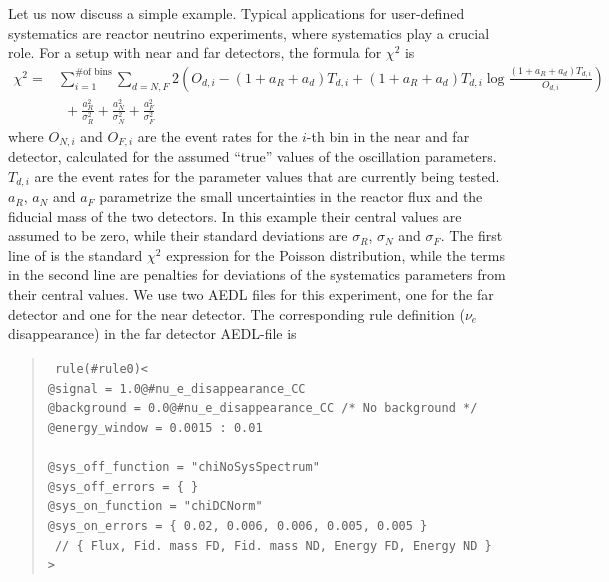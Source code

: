 Let us now discuss a simple example.  Typical applications for user-defined systematics are reactor neutrino experiments, where systematics play a crucial role. For a setup with near and far detectors,
the formula for $\chi^2$ is
\begin{align}
  \chi^2 =& \sum_{i=1}^{\textrm{\# of bins}} \sum_{d = N,F}2
     \left( O_{d,i} - (1 + a_R + a_d) T_{d,i} +
       (1 + a_R + a_d) T_{d,i} \log \frac{(1 + a_R + a_d) T_{d,i}}{O_{d,i}}  \right) \nonumber\\
         & \ \ + \frac{a_R^2}{\sigma_R^2} + \frac{a_N^2}{\sigma_N^2} + \frac{a_F^2}{\sigma_F^2}
\label{equ:chi2reactor}
\end{align}
where $O_{N,i}$ and $O_{F,i}$ are the event rates for the $i$-th bin in the near and
far detector, calculated for the assumed ``true'' values of the oscillation parameters.
$T_{d,i}$ are the event rates for the parameter values that are currently being tested.
$a_R$, $a_N$ and $a_F$ parametrize the small uncertainties in the reactor flux and the fiducial
mass of the two detectors. In this example their central values are assumed to be zero,
while their standard deviations are $\sigma_R$, $\sigma_N$ and $\sigma_F$.
%
The first line of  is the standard $\chi^2$ expression for
the Poisson distribution, while the terms in the second line are penalties
for deviations of the systematics parameters from their central values. 
%
We use two AEDL files for this experiment, one for the far detector and one for the
near detector.
The corresponding rule definition ($\nu_e$ disappearance) in the far detector AEDL-file is
\begin{quote}
{\tt
rule(\#rule0)< \\
\hspace*{0.5cm}        @signal     = 1.0@\#nu\_e\_disappearance\_CC \\
\hspace*{0.5cm}        @background = 0.0@\#nu\_e\_disappearance\_CC   /* No background */ \\
\hspace*{0.5cm} @energy\_window = 0.0015 : 0.01 \\
\\
\hspace*{0.5cm}        @sys\_off\_function = "chiNoSysSpectrum" \\
\hspace*{0.5cm}        @sys\_off\_errors   = \{ \} \\
\hspace*{0.5cm}        @sys\_on\_function  = "chiDCNorm" \\
\hspace*{0.5cm}        @sys\_on\_errors    = \{ 0.02,    0.006,        0.006,       0.005,     0.005   \} \\
\hspace*{0.5cm}        \mbox{ // \{ Flux, Fid. mass FD, Fid. mass ND, Energy FD, Energy ND \} } \\
> 
}
\end{quote}
